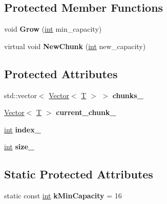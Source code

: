 \subsection*{Protected Member Functions}
\begin{DoxyCompactItemize}
\item 
\mbox{\label{classv8_1_1internal_1_1Collector_a64538c3871b9027c063536b7422e4934}} 
void {\bfseries Grow} (\mbox{\hyperlink{classint}{int}} min\+\_\+capacity)
\item 
\mbox{\label{classv8_1_1internal_1_1Collector_ae5c13b4d64ac101f050251ce9b9f633e}} 
virtual void {\bfseries New\+Chunk} (\mbox{\hyperlink{classint}{int}} new\+\_\+capacity)
\end{DoxyCompactItemize}
\subsection*{Protected Attributes}
\begin{DoxyCompactItemize}
\item 
\mbox{\label{classv8_1_1internal_1_1Collector_a9107891b92ded5784e82b27d8af95498}} 
std\+::vector$<$ \mbox{\hyperlink{classv8_1_1internal_1_1Vector}{Vector}}$<$ \mbox{\hyperlink{classv8_1_1internal_1_1torque_1_1T}{T}} $>$ $>$ {\bfseries chunks\+\_\+}
\item 
\mbox{\label{classv8_1_1internal_1_1Collector_ae18ddaaf7f76b38ad5fc776374f8e54b}} 
\mbox{\hyperlink{classv8_1_1internal_1_1Vector}{Vector}}$<$ \mbox{\hyperlink{classv8_1_1internal_1_1torque_1_1T}{T}} $>$ {\bfseries current\+\_\+chunk\+\_\+}
\item 
\mbox{\label{classv8_1_1internal_1_1Collector_a450843df09b65a6b00a2dbd1df9f6dd1}} 
\mbox{\hyperlink{classint}{int}} {\bfseries index\+\_\+}
\item 
\mbox{\label{classv8_1_1internal_1_1Collector_a18fc8b51241e805a2980ba8aaacc1c5b}} 
\mbox{\hyperlink{classint}{int}} {\bfseries size\+\_\+}
\end{DoxyCompactItemize}
\subsection*{Static Protected Attributes}
\begin{DoxyCompactItemize}
\item 
\mbox{\label{classv8_1_1internal_1_1Collector_a559be84477f49672e512b636e6b6d8bb}} 
static const \mbox{\hyperlink{classint}{int}} {\bfseries k\+Min\+Capacity} = 16
\end{DoxyCompactItemize}


